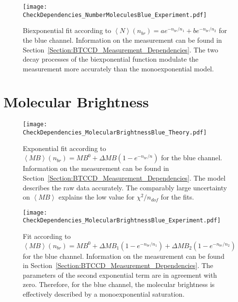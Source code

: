 \vfill
\begin{figure}[h]
	\centering
	\texttt{[image: CheckDependencies\_NumberMoleculesBlue\_Experiment.pdf]}
	\caption[Biexponential fit of molecule number for blue channel]{Biexponential fit according to $\left\langle N \right\rangle (n_{br}) = ae^{-n_{br}/ n_1} + be^{-n_{br}/ n_2}$ for the blue channel. Information on the measurement can be found in Section~\ref{Section:BTCCD_Measurement_Dependencies}. The two decay processes of the biexponential function modulate the measurement more accurately than the monoexponential model.}
	\label{fig:CheckDependencies_NumberMoleculesBlue_Experiment}
\end{figure}
\vfill

\clearpage

\section{Molecular Brightness} 

\vfill
\begin{figure}[h!]
	\centering
	\texttt{[image: CheckDependencies\_MolecularBrightnessBlue\_Theory.pdf]}
	\caption[Exponential fit of molecular brightness for blue channel]{Exponential fit according to $\left\langle MB \right\rangle (n_{br}) = MB^0 + \Delta MB(1 - e^{-n_{br}/ n})$ for the blue channel. Information on the measurement can be found in Section~\ref{Section:BTCCD_Measurement_Dependencies}. The model describes the raw data accurately. The comparably large uncertainty on $\left\langle MB \right\rangle$ explains the low value for $\chi^2/ n_{dof}$ for the fits.}
	\label{fig:CheckDependencies_MolecularBrightnessBlue_Theory}
\end{figure}
\vfill

\vfill
\begin{figure}[h]
	\centering
	\texttt{[image: CheckDependencies\_MolecularBrightnessBlue\_Experiment.pdf]}
	\caption[Biexponential fit of molecular brightness for blue channel]{Fit according to $\left\langle MB \right\rangle (n_{br}) = MB^0 + \Delta MB_1(1 - e^{-n_{br}/ n_1}) + \Delta MB_2(1 - e^{-n_{br}/ n_2})$ for the blue channel. Information on the measurement can be found in Section~\ref{Section:BTCCD_Measurement_Dependencies}. The parameters of the second exponential term are in agreement with zero. Therefore, for the blue channel, the molecular brightness is effectively described by a monoexponential saturation.}
	\label{fig:CheckDependencies_MolecularBrightnessBlue_Experiment}
\end{figure}
\vfill

